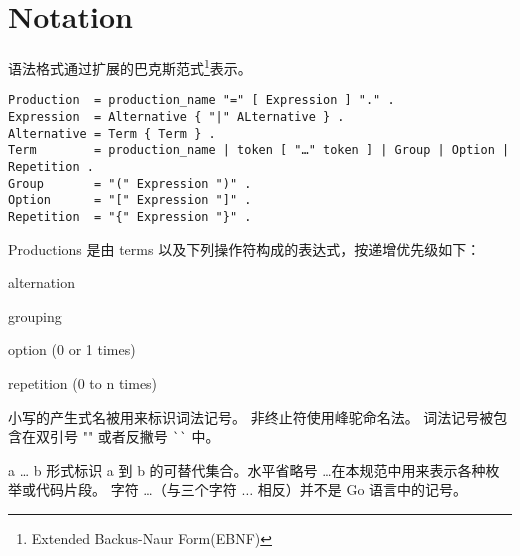 
\chapter{Notation}
语法格式通过扩展的巴克斯范式\footnote{Extended Backus-Naur Form(EBNF)}表示。
\begin{lstlisting}[style=EBNF]
Production	= production_name "=" [ Expression ] "." .
Expression 	= Alternative { "|" ALternative } .
Alternative = Term { Term } .
Term        = production_name | token [ "…" token ] | Group | Option | Repetition .
Group       = "(" Expression ")" .
Option      = "[" Expression "]" .
Repetition  = "{" Expression "}" .
\end{lstlisting}

Productions 是由 terms 以及下列操作符构成的表达式，按递增优先级如下：
\begin{description}[font=\ttfamily\bfseries, style=nextline, leftmargin=2\parindent, labelindent=\parindent]
	\item [|] alternation
	\item [()] grouping
	\item [{[]}] option (0 or 1 times)
	\item [\{\}] repetition (0 to n times)
\end{description}
小写的产生式名被用来标识词法记号。
非终止符使用峰驼命名法。
词法记号被包含在双引号 "" 或者反撇号 \lstinline|``| 中。

 a \dots{} b 形式标识 a 到 b 的可替代集合。水平省略号 \dots 在本规范中用来表示各种枚举或代码片段。
 字符 \dots（与三个字符 $\ldots$ 相反）并不是 Go 语言中的记号。